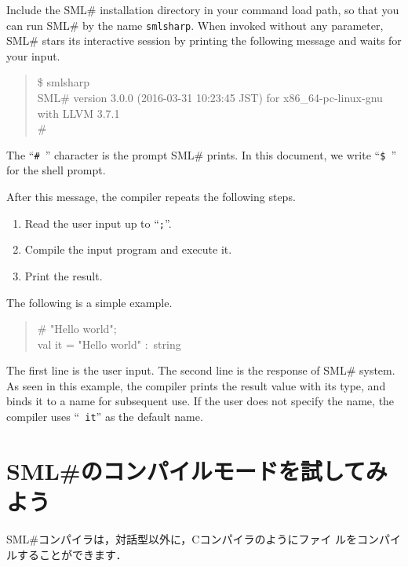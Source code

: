 \documentclass{jbook}
\newif\ifjp
\newcommand{\txt}[2]{#1}
\newcommand{\smlsharp}{SML\#}
\newcommand{\version}{3.0.0}
\newcommand{\releaseDate}{2016-03-31 10:23:45 JST}
\newenvironment{program}{\begin{quote}\begin{tt}}%
                        {\end{tt}\end{quote}}
\begin{document}
	Include the \smlsharp{} installation directory in your command
load path,  so that you can run \smlsharp{} by the name {\tt smlsharp}.
	When invoked without any parameter, \smlsharp{} stars its
interactive session by printing the following message and waits for your
input.
\begin{program}
\$ smlsharp\\
SML\# version \version{} (\releaseDate{}) for x86\_64-pc-linux-gnu with LLVM 3.7.1\\
\# 
\end{program}
	The ``{\tt \#\ }'' character is the prompt \smlsharp{}
prints.
	In this document, we write ``{\tt \$\ }'' for the 
shell prompt.

	After this message, the compiler repeats the following steps. 
\begin{enumerate}
\item Read the user input up to ``{\tt ;}''.
\item Compile the input program and execute it.
\item Print the result.
\end{enumerate}
	The following is a simple example.
\begin{tt}
\begin{quote}
\# "Hello world";\\
val it = "Hello world" :~string
\end{quote}
\end{tt}
	The first line is the user input.
	The second line is the response of \smlsharp{} system.
	As seen in this example, the compiler prints the result value with
its type, and binds it to a name for subsequent use.
	If the user does not specify the name, the compiler uses  ``{\tt
it}'' as the default name.

\fi%

\section{
\txt
{\smlsharp{}のコンパイルモードを試してみよう}
{Let's try \smlsharp{} compile mode}
}
\label{sec:tutorialCompile}

\ifjp%
	\smlsharp{}コンパイラは，対話型以外に，Cコンパイラのようにファイ
ルをコンパイルすることができます．
\end{document}
